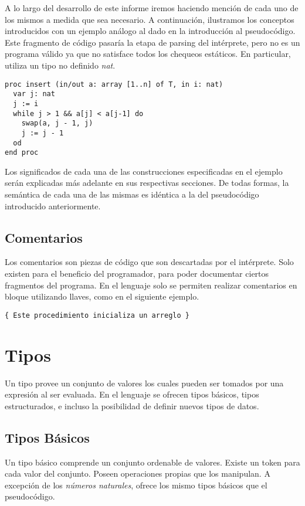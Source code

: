 \documentclass{article}
\begin{document}
A lo largo del desarrollo de este informe iremos haciendo mención de cada uno de los mismos a medida que sea necesario.
A continuación, ilustramos los conceptos introducidos con un ejemplo análogo al dado en la introducción al pseudocódigo.
Este fragmento de código pasaría la etapa de parsing del intérprete, pero no es un programa válido ya que no satisface todos los chequeos estáticos.
En particular, utiliza un tipo no definido \textit{nat}.
\begin{lstlisting}
proc insert (in/out a: array [1..n] of T, in i: nat)
  var j: nat
  j := i
  while j > 1 && a[j] < a[j-1] do
    swap(a, j - 1, j)
    j := j - 1
  od
end proc
\end{lstlisting}

Los significados de cada una de las construcciones especificadas en el ejemplo serán explicadas más adelante en sus respectivas secciones.
De todas formas, la semántica de cada una de las mismas es idéntica a la del pseudocódigo introducido anteriormente.

\subsection{Comentarios}

Los comentarios son piezas de código que son descartadas por el intérprete.
Solo existen para el beneficio del programador, para poder documentar ciertos fragmentos del programa.
En el lenguaje solo se permiten realizar comentarios en bloque utilizando llaves, como en el siguiente ejemplo.
\begin{lstlisting}
{ Este procedimiento inicializa un arreglo }
\end{lstlisting}

\section{Tipos}

Un tipo provee un conjunto de valores los cuales pueden ser tomados por una expresión al ser evaluada.
En el lenguaje se ofrecen tipos básicos, tipos estructurados, e incluso la posibilidad de definir nuevos tipos de datos.

\subsection{Tipos Básicos}

Un tipo básico comprende un conjunto ordenable de valores.
Existe un token para cada valor del conjunto.
Poseen operaciones propias que los manipulan.
A excepción de los \textit{números naturales}, \Lang\space ofrece los mismo tipos básicos que el pseudocódigo.
\end{document}
